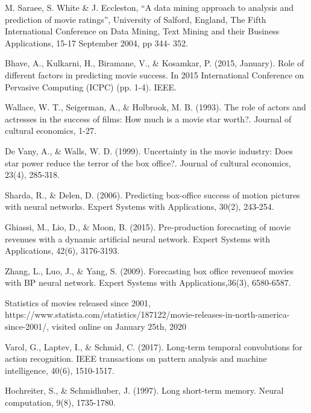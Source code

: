 {
\begin{thebibliography}{25}


M. Saraee, S. White \& J. Eccleston, “A data mining approach to analysis and prediction of movie ratings”, University of Salford, England, The Fifth International Conference on Data Mining, Text Mining and their Business Applications, 15-17 September 2004, pp 344- 352.

Bhave, A., Kulkarni, H., Biramane, V., \& Kosamkar, P. (2015, January). Role of different factors in predicting movie success. In 2015 International Conference on Pervasive Computing (ICPC) (pp. 1-4). IEEE.
 
Wallace, W. T., Seigerman, A., \& Holbrook, M. B. (1993). The role of actors and actresses in the success of films: How much is a movie star worth?. Journal of cultural economics, 1-27.

De Vany, A., \& Walls, W. D. (1999). Uncertainty in the movie industry: Does star power reduce the terror of the box office?. Journal of cultural economics, 23(4), 285-318.

Sharda, R., \& Delen, D. (2006). Predicting box-office success of motion pictures with neural networks. Expert Systems with Applications, 30(2), 243-254.

Ghiassi, M., Lio, D., \& Moon, B. (2015). Pre-production forecasting of movie revenues with a dynamic artificial neural network. Expert Systems with Applications, 42(6), 3176-3193.

Zhang,  L.,  Luo,  J.,  \&  Yang,  S.  (2009).  Forecasting  box  office  revenueof movies with BP neural network. Expert Systems with Applications,36(3), 6580-6587.

Statistics of movies released since 2001, https://www.statista.com/statistics/187122/movie-releases-in-north-america-since-2001/, visited online on January 25th, 2020

Varol, G., Laptev, I., \& Schmid, C. (2017). Long-term temporal convolutions for action recognition. IEEE transactions on pattern analysis and machine intelligence, 40(6), 1510-1517.
 
Hochreiter, S., \& Schmidhuber, J. (1997). Long short-term memory. Neural computation, 9(8), 1735-1780.


\end{thebibliography}}
